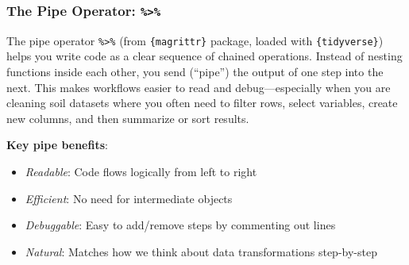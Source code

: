 \documentclass[
  10pt,
  b5paper,
  oneside]{book}
\newenvironment{Shaded}{\begin{snugshade}}{\end{snugshade}}
\newcommand{\CommentTok}[1]{\textcolor[rgb]{0.56,0.35,0.01}{\textit{#1}}}
\newcommand{\DecValTok}[1]{\textcolor[rgb]{0.00,0.00,0.81}{#1}}
\newcommand{\FunctionTok}[1]{\textcolor[rgb]{0.13,0.29,0.53}{\textbf{#1}}}
\newcommand{\NormalTok}[1]{#1}
\newcommand{\SpecialCharTok}[1]{\textcolor[rgb]{0.81,0.36,0.00}{\textbf{#1}}}
\begin{document}
\subsubsection{\texorpdfstring{The Pipe Operator: \texttt{\%\textgreater{}\%}}{The Pipe Operator: \%\textgreater\%}}\label{tidyverse-pipe}

The pipe operator \texttt{\%\textgreater{}\%} (from \texttt{\{magrittr\}} package, loaded with \texttt{\{tidyverse\}}) helps you write code as a clear sequence of chained operations. Instead of nesting functions inside each other, you send (``pipe'') the output of one step into the next. This makes workflows easier to read and debug---especially when you are cleaning soil datasets where you often need to filter rows, select variables, create new columns, and then summarize or sort results.

\begin{Shaded}
\end{Shaded}

\textbf{Key pipe benefits}:

\begin{itemize}
\item
  \emph{Readable}: Code flows logically from left to right
\item
  \emph{Efficient}: No need for intermediate objects
\item
  \emph{Debuggable}: Easy to add/remove steps by commenting out lines
\item
  \emph{Natural}: Matches how we think about data transformations step-by-step
\end{itemize}
\end{document}
